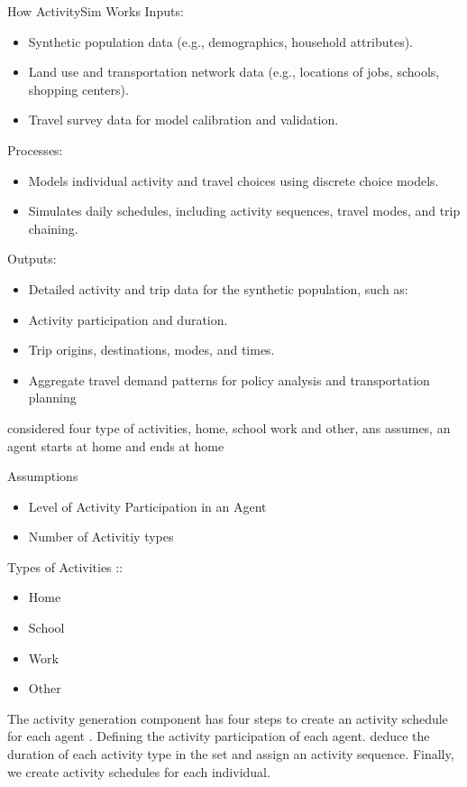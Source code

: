 \documentclass[../main.tex]{subfiles}
\begin{document}
How ActivitySim Works
Inputs:
\begin{itemize}
    \item  Synthetic population data (e.g., demographics, household attributes).
\item Land use and transportation network data (e.g., locations of jobs, schools, shopping centers).
\item Travel survey data for model calibration and validation.
\end{itemize}


Processes:
\begin{itemize}
    \item 
Models individual activity and travel choices using discrete choice models.
\item Simulates daily schedules, including activity sequences, travel modes, and trip chaining.
\end{itemize}
Outputs:
\begin{itemize}
\item Detailed activity and trip data for the synthetic population, such as:
\item Activity participation and duration.
\item Trip origins, destinations, modes, and times.
\item Aggregate travel demand patterns for policy analysis and transportation planning
\end{itemize}


\citep{Tozluoglu2023APatterns} considered four type of activities, home, school work and other, ans assumes, an agent starts at home and ends at home







Assumptions
\begin{itemize}
    \item Level of Activity Participation in an Agent
    \item Number of Activitiy types
\end{itemize}

Types of Activities ::
\begin{itemize}
    \item Home
    \item School
    \item Work
    \item Other
\end{itemize}


The activity generation component has four steps to create an activity schedule for each agent . Defining the activity participation of each agent. deduce the duration of each activity type in the set and assign an activity sequence. Finally, we create activity schedules for each individual.
\end{document}
